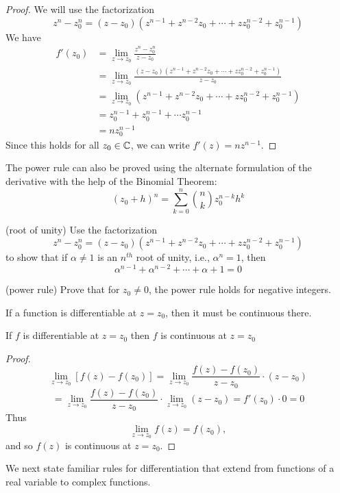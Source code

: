 \documentclass[handout]{ximera}
\begin{document}
\begin{proof}
We will use the factorization
\[
z^n - z_0^n = (z-z_0)\left(z^{n-1} + z^{n-2}z_0 + \cdots + zz_0^{n-2} + z_0^{n-1} \right)
\]
We have
\begin{align*}
f'(z_0) &= \lim_{z \to z_0} \frac{z^n - z_0^n}{z-z_0} \\
        &=\lim_{z \to z_0} \frac{(z-z_0)\left(z^{n-1} + z^{n-2}z_0 + \cdots + zz_0^{n-2} + z_0^{n-1} \right)}{z-z_0} \\
        &= \lim_{z \to z_0} \left(z^{n-1} + z^{n-2}z_0 + \cdots + zz_0^{n-2} + z_0^{n-1} \right)\\
        & = z_0^{n-1} + z_0^{n-1} + \cdots z_0^{n-1}\\
        & = nz_0^{n-1}
\end{align*}
Since this holds for all $z_0 \in \mathbb C$, we can write $f'(z) = nz^{n-1}$.

\end{proof}


\begin{remark}
The power rule can also be proved using the alternate formulation of the derivative with the help of the Binomial Theorem:
\[
(z_0 + h)^n = \sum_{k = 0}^n \binom{n}{k} z_0^{n-k} h^k
\]
\end{remark}


\begin{problem}(root of unity)
Use the factorization 
\[
z^n - z_0^n = (z-z_0)\left(z^{n-1} + z^{n-2}z_0 + \cdots + zz_0^{n-2} + z_0^{n-1} \right)
\]
to show that if $\alpha \neq 1$ is an $n^{th}$ root of unity, i.e., $\alpha^n = 1$, then
\[
\alpha^{n-1} + \alpha^{n-2} + \cdots + \alpha + 1 = 0
\]
\end{problem}

\begin{problem}(power rule)
Prove that for $z_0 \neq 0$, the power rule holds for negative integers.
\end{problem}

If a function is differentiable at $z= z_0$, then it must be continuous there.
\begin{theorem}
If $f$ is differentiable at $z = z_0$ then $f$ is continuous at $z = z_0$
\end{theorem}
\begin{proof}
\[
\lim_{z\to z_0} \left[f(z) - f(z_0)\right] = \lim_{z\to z_0} \frac{f(z) - f(z_0)}{z-z_0} \cdot (z-z_0)
\]
\[
= \lim_{z\to z_0} \frac{f(z) - f(z_0)}{z-z_0} \cdot \lim_{z\to z_0}(z-z_0) = f'(z_0) \cdot 0 = 0
\]
Thus
\[
 \lim_{z\to z_0} f(z) = f(z_0),
 \]
 and so $f(z)$ is continuous at $z = z_0$.
\end{proof}
We next state familiar rules for differentiation that extend from functions of a real variable to complex functions.
\end{document}
